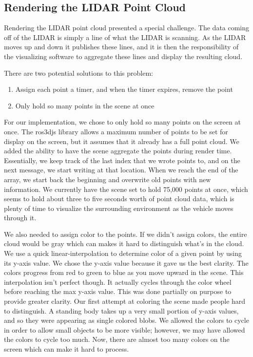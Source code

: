 \subsection{Rendering the LIDAR Point Cloud}
Rendering the LIDAR point cloud presented a special challenge.  The data coming off of the LIDAR is simply a line of what the LIDAR is scanning.  As the LIDAR moves up and down it publishes these lines, and it is then the responsibility of the visualizing software to aggregate these lines and display the resulting cloud.

There are two potential solutions to this problem:
\begin{enumerate}
    \item Assign each point a timer, and when the timer expires, remove the point
    \item Only hold so many points in the scene at once
\end{enumerate}

For our implementation, we chose to only hold so many points on the screen at once.  The ros3djs library allows a maximum number of points to be set for display on the screen, but it assumes that it already has a full point cloud.  We added the ability to have the scene aggregate the points during render time.  Essentially, we keep track of the last index that we wrote points to, and on the next message, we start writing at that location.  When we reach the end of the array, we start back the beginning and overwrite old points with new information.  We currently have the scene set to hold 75,000 points at once, which seems to hold about three to five seconds worth of point cloud data, which is plenty of time to visualize the surrounding environment as the vehicle moves through it.

We also needed to assign color to the points.  If we didn't assign colors, the entire cloud would be gray which can makes it hard to distinguish what's in the cloud.  We use a quick linear-interpolation to determine color of a given point by using its y-axis value.  We chose the y-axis value because it gave us the best clarity.  The colors progress from red to green to blue as you move upward in the scene.  This interpolation isn't perfect though.  It actually cycles through the color wheel before reaching the max y-axis value.  This was done partially on purpose to provide greater clarity.  Our first attempt at coloring the scene made people hard to distinguish.  A standing body takes up a very small portion of y-axis values, and so they were appearing as single colored blobs.  We allowed the colors to cycle in order to allow small objects to be more visible; however, we may have allowed the colors to cycle too much.  Now, there are almost too many colors on the screen which can make it hard to process.


